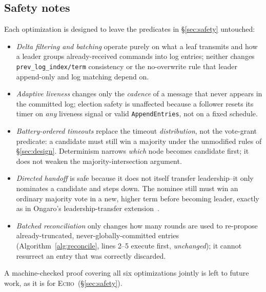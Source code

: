 \documentclass[conference]{IEEEtran}
\newcommand{\echoproto}{\textsc{Echo}\xspace}
\begin{document}
\subsection{Safety notes}\label{sec:echod-safety}
Each optimization is designed to leave the predicates in
\S\ref{sec:safety} untouched:
\begin{itemize}
\item \emph{Delta filtering and batching} operate purely on what a leaf
  transmits and how a leader groups already-received commands into log
  entries; neither changes \texttt{prev\_log\_index/term} consistency
  or the no-overwrite rule that leader append-only and log matching
  depend on.
\item \emph{Adaptive liveness} changes only the \emph{cadence} of a
  message that never appears in the committed log; election safety is
  unaffected because a follower resets its timer on \emph{any}
  liveness signal or valid \texttt{AppendEntries}, not on a fixed
  schedule.
\item \emph{Battery-ordered timeouts} replace the timeout
  \emph{distribution}, not the vote-grant predicate: a candidate must
  still win a majority under the unmodified rules of
  \S\ref{sec:design}. Determinism narrows \emph{which} node becomes
  candidate first; it does not weaken the majority-intersection
  argument.
\item \emph{Directed handoff} is safe because it does not itself
  transfer leadership--it only nominates a candidate and steps down.
  The nominee still must win an ordinary majority vote in a new,
  higher term before becoming leader, exactly as in
  Ongaro's leadership-transfer extension~\cite{ongaro2014dissertation}.
\item \emph{Batched reconciliation} only changes how many rounds are
  used to re-propose already-truncated, never-globally-committed
  entries (Algorithm~\ref{alg:reconcile}, lines 2--5 execute first,
  \emph{unchanged}); it cannot resurrect an entry that was correctly
  discarded.
\end{itemize}
A machine-checked proof covering all six optimizations jointly is left
to future work, as it is for \echoproto\ (\S\ref{sec:safety}).
\end{document}
